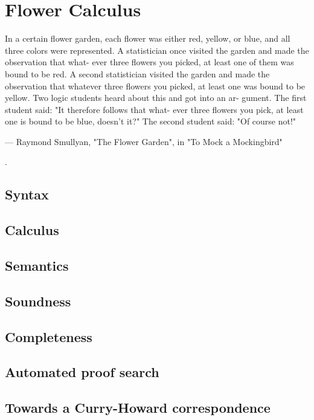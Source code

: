 \setchapterpreamble[u]{\margintoc}
\chapter{Flower Calculus}


In a certain flower garden, each flower was either red, yellow,
or blue, and all three colors were represented. A statistician
once visited the garden and made the observation that what-
ever three flowers you picked, at least one of them was bound
to be red. A second statistician visited the garden and made
the observation that whatever three flowers you picked, at
least one was bound to be yellow.
Two logic students heard about this and got into an ar-
gument. The first student said: "It therefore follows that what-
ever three flowers you pick, at least one is bound to be blue,
doesn't it?" The second student said: "Of course not!"

--- Raymond Smullyan, "The Flower Garden", in "To Mock a Mockingbird"

.

\section{Syntax}

\section{Calculus}

\section{Semantics}

\section{Soundness}

\section{Completeness}

\section{Automated proof search}

\section{Towards a Curry-Howard correspondence}